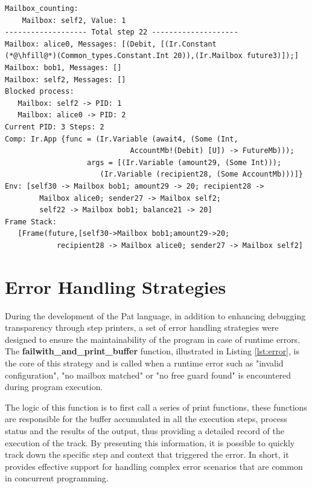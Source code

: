 \documentclass{l4proj}
\begin{document}
\noindent\begin{minipage}{\linewidth}
\lstset{style=printer,}
\begin{lstlisting}[caption={Example of Evaluation Step Printer Output}, label={lst:output}]
Mailbox_counting:
    Mailbox: self2, Value: 1
------------------- Total step 22 --------------------
Mailbox: alice0, Messages: [(Debit, [(Ir.Constant 
(*@\hfill@*)(Common_types.Constant.Int 20)),(Ir.Mailbox future3)]);]
Mailbox: bob1, Messages: []
Mailbox: self2, Messages: []
Blocked process:
   Mailbox: self2 -> PID: 1 
   Mailbox: alice0 -> PID: 2 
Current PID: 3 Steps: 2
Comp: Ir.App {func = (Ir.Variable (await4, (Some (Int, 
                             AccountMb!(Debit) [U]) -> FutureMb)));
                   args = [(Ir.Variable (amount29, (Some Int)));
                      (Ir.Variable (recipient28, (Some AccountMb)))]}
Env: [self30 -> Mailbox bob1; amount29 -> 20; recipient28 -> 
        Mailbox alice0; sender27 -> Mailbox self2; 
        self22 -> Mailbox bob1; balance21 -> 20]
Frame Stack: 
   [Frame(future,[self30->Mailbox bob1;amount29->20; 
            recipient28 -> Mailbox alice0; sender27 -> Mailbox self2]
\end{lstlisting}
\end{minipage}

\section{Error Handling Strategies}

During the development of the Pat language, in addition to enhancing debugging transparency through step printers, a set of error handling strategies were designed to ensure the maintainability of the program in case of runtime errors. The \textbf{failwith\_and\_print\_buffer} function, illustrated in Listing \ref{lst:error}, is the core of this strategy and is called when a runtime error such as "invalid configuration", "no mailbox matched" or "no free guard found" is encountered during program execution.

The logic of this function is to first call a series of print functions, these functions are responsible for the buffer accumulated in all the execution steps, process status and the results of the output, thus providing a detailed record of the execution of the track. By presenting this information, it is possible to quickly track down the specific step and context that triggered the error. In short, it provides effective support for handling complex error scenarios that are common in concurrent programming.
\end{document}

